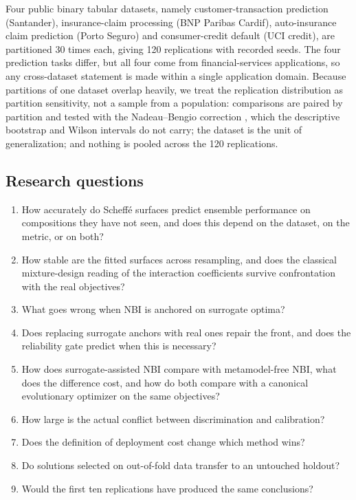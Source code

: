 Four public binary tabular datasets, namely customer-transaction prediction (Santander), insurance-claim processing (BNP
Paribas Cardif), auto-insurance claim prediction (Porto Seguro) and consumer-credit default (UCI credit), are
partitioned 30 times each, giving 120 replications with recorded seeds. The four prediction tasks differ, but all four
come from financial-services applications, so any cross-dataset statement is made within a single application domain.
Because partitions of one dataset overlap heavily, we treat the replication distribution as partition sensitivity, not
a sample from a population: comparisons are paired by partition and tested with the Nadeau--Bengio correction
\citep{nadeau2003inference}, which the descriptive bootstrap and Wilson intervals do not carry; the dataset is the
unit of generalization; and nothing is pooled across the 120 replications.

\subsection{Research questions}

\begin{enumerate}
\item[\textbf{RQ1}] How accurately do Scheffé surfaces predict ensemble performance on compositions they have not
seen, and does this depend on the dataset, on the metric, or on both?
\item[\textbf{RQ2}] How stable are the fitted surfaces across resampling, and does the classical mixture-design
reading of the interaction coefficients survive confrontation with the real objectives?
\item[\textbf{RQ3}] What goes wrong when NBI is anchored on surrogate optima?
\item[\textbf{RQ4}] Does replacing surrogate anchors with real ones repair the front, and does the reliability gate
predict when this is necessary?
\item[\textbf{RQ5}] How does surrogate-assisted NBI compare with metamodel-free NBI, what does the difference cost,
and how do both compare with a canonical evolutionary optimizer on the same objectives?
\item[\textbf{RQ6}] How large is the actual conflict between discrimination and calibration?
\item[\textbf{RQ7}] Does the definition of deployment cost change which method wins?
\item[\textbf{RQ8}] Do solutions selected on out-of-fold data transfer to an untouched holdout?
\item[\textbf{RQ9}] Would the first ten replications have produced the same conclusions?
\end{enumerate}

